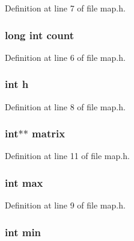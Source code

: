 Definition at line 7 of file map.\-h.

\hypertarget{structmap__t_aabbb2f7768ed83b49f05e7911e3a693a}{
\subsubsection[{count}]{\setlength{\rightskip}{0pt plus 5cm}long int count}}\label{structmap__t_aabbb2f7768ed83b49f05e7911e3a693a}


Definition at line 6 of file map.\-h.

\hypertarget{structmap__t_a16611451551e3d15916bae723c3f59f7}{
\subsubsection[{h}]{\setlength{\rightskip}{0pt plus 5cm}int h}}\label{structmap__t_a16611451551e3d15916bae723c3f59f7}


Definition at line 8 of file map.\-h.

\hypertarget{structmap__t_ac29a4fcfe6e2fb5a94cb5350ac977ce4}{
\subsubsection[{matrix}]{\setlength{\rightskip}{0pt plus 5cm}int$\ast$$\ast$ matrix}}\label{structmap__t_ac29a4fcfe6e2fb5a94cb5350ac977ce4}


Definition at line 11 of file map.\-h.

\hypertarget{structmap__t_ae1e1dde676c120fa6d10f3bb2c14059e}{
\subsubsection[{max}]{\setlength{\rightskip}{0pt plus 5cm}int max}}\label{structmap__t_ae1e1dde676c120fa6d10f3bb2c14059e}


Definition at line 9 of file map.\-h.

\hypertarget{structmap__t_a3e202b201e6255d975cd6d3aff1f5a4d}{
\subsubsection[{min}]{\setlength{\rightskip}{0pt plus 5cm}int min}}\label{structmap__t_a3e202b201e6255d975cd6d3aff1f5a4d}


